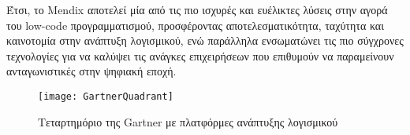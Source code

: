         Έτσι, το Mendix αποτελεί μία από τις πιο ισχυρές και ευέλικτες λύσεις στην αγορά του low-code προγραμματισμού, προσφέροντας αποτελεσματικότητα, ταχύτητα και καινοτομία στην ανάπτυξη λογισμικού, ενώ παράλληλα ενσωματώνει τις πιο σύγχρονες τεχνολογίες για να καλύψει τις ανάγκες επιχειρήσεων που επιθυμούν να παραμείνουν ανταγωνιστικές στην ψηφιακή εποχή.

        \cite{LowCodeMendix}




            \begin{figure}[h!] \noindent \centering
                    \texttt{[image: GartnerQuadrant]}
                    \caption{\centering Τεταρτημόριο της Gartner με πλατφόρμες ανάπτυξης λογισμικού \cite{mendixGartnerQuadrant}}
            \end{figure}


